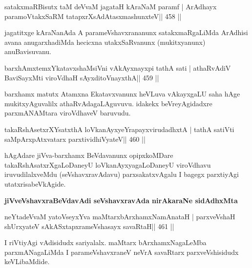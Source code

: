 \begin{shl}
satakxmaRBisutx taM deVvaM jagataH kAraNaM paramf |
ArAdhayx paramoVtakxSaRM tatapxrXsAdAtasxmashunxteV\hfill || 458 ||
\end{shl}

\begin{artha}
jagatitxge kAraNanAda A parameVshavxrananunx satakxmaRgaLiMda ArAdhisi
avana anugarxhadiMda hecicxna utakxSaRvanunx (mukitxyanunx) anuBavisuvanu.
\end{artha}


\begin{shl}
barxhAmxtemxYkatavxshaMsiVni vAkAyxnayxpi tathA sati |
athaRvAdiV BaviSayxMti viroVdhaH sAyxditoV\s nayxthA\hfill || 459 ||
\end{shl}

\begin{artha}
barxhamx matutx Atamxna Ekatavxvanunx heVLuva vAkayxgaLU saha hAge mukitxyAguvalilx athaRvAdagaLAguvuvu. idakekx beVreyAgidadxre parxmANAMtara viroVdhaveV baruvudu.
\end{artha}

\begin{shl}
takaRshAsetxrXYsatxthA loVkanAyxyeYrapayxvirudadhxtA |
tathA satiVti saMpArxpAtxvatarx parxtividhiVyateV\hfill || 460 ||
\end{shl}


\begin{artha}
hAgAdare jiVva-barxhamx BeVdavanunx opipxkoMDare
takaRshAsatxrXgaLoDaneyU 
loVkanAyxyagaLoDaneyU viroVdhavu iruvudilalxveMdu (seVshavxravAdavu)
parxsakatxvAgalu I bagegx parxtiyAgi utatxrisabeVkAgide.
\end{artha}

\medskip
\centerline{\textbf{jiVveVshavxraBeVdavAdi seVshavxravAda nirAkaraNe
    sidAdhxMta}}
\medskip

\begin{shl}
neYtadeVvaM yatoV\s seyxYva maMtarxbArxhamxNamAnataH |
parxveVshaH shUrxyateV sAkASxtapxrameVshasayx savaRtaH\hfill || 461 ||
\end{shl}

\begin{artha}
I riVtiyAgi vAdisidudx sariyalalx. maMtarx bArxhamxNagaLeMba parxmANagaLiMda I parameVshavxraneV neVrA savaRtarx parxveVshisidudx keVLibaMdide.
\end{artha}

